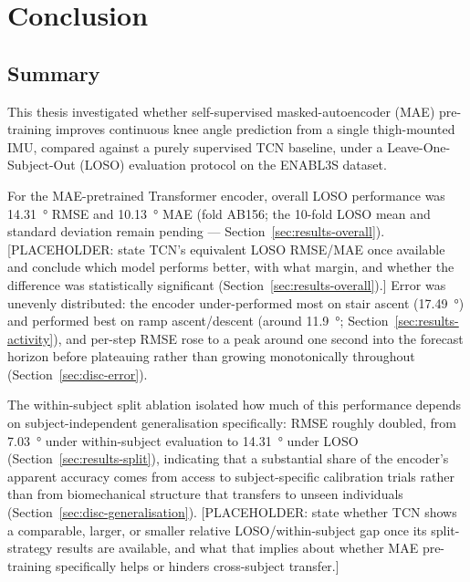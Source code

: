 
\section{Conclusion}\label{sec:Conclusion}

\subsection{Summary}\label{sec:conclusion-summary}

This thesis investigated whether self-supervised masked-autoencoder (MAE)
pre-training improves continuous knee angle prediction from a single
thigh-mounted IMU, compared against a purely supervised TCN baseline, under a
Leave-One-Subject-Out (LOSO) evaluation protocol on the ENABL3S dataset.

For the MAE-pretrained Transformer encoder, overall LOSO performance was
\SI{14.31}{\degree} RMSE and \SI{10.13}{\degree} MAE (fold AB156; the
\num{10}-fold LOSO mean and standard deviation remain pending —
Section~\ref{sec:results-overall}). [PLACEHOLDER: state TCN's equivalent LOSO
RMSE/MAE once available and conclude which model performs better, with what
margin, and whether the difference was statistically significant
(Section~\ref{sec:results-overall}).] Error was unevenly distributed: the
encoder under-performed most on stair ascent (\SI{17.49}{\degree}) and
performed best on ramp ascent/descent (around \SI{11.9}{\degree};
Section~\ref{sec:results-activity}), and per-step RMSE rose to a peak around
one second into the forecast horizon before plateauing rather than growing
monotonically throughout (Section~\ref{sec:disc-error}).

The within-subject split ablation isolated how much of this performance
depends on subject-independent generalisation specifically: RMSE roughly
doubled, from \SI{7.03}{\degree} under within-subject evaluation to
\SI{14.31}{\degree} under LOSO (Section~\ref{sec:results-split}), indicating
that a substantial share of the encoder's apparent accuracy comes from
access to subject-specific calibration trials rather than from biomechanical
structure that transfers to unseen individuals
(Section~\ref{sec:disc-generalisation}). [PLACEHOLDER: state whether TCN
shows a comparable, larger, or smaller relative LOSO/within-subject gap once
its split-strategy results are available, and what that implies about
whether MAE pre-training specifically helps or hinders cross-subject
transfer.]


